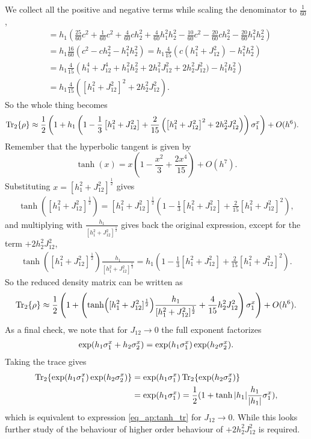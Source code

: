 We collect all the positive and negative terms while scaling the denominator to $\frac{1}{60}$,
\begin{align*}
    & = h_1\left(\frac{25}{60}c^2 + \frac{1}{60}c^2  + \frac{4}{60}c h_2^2 +  \frac{4}{60}h_1^2 h_2^2 - \frac{10}{60} c^2 - \frac{20}{60} ch_2^2 - \frac{20}{60} h_1^2 h_2^2 \right)\\
    & = h_1\frac{16}{60}\left(c^2 - c h_2^2 -  h_1^2 h_2^2 \right)= h_1\frac{4}{15}\left(c(h_1^2 + J_{12}^2) -  h_1^2 h_2^2 \right) \\
    & = h_1\frac{4}{15}\left(h_1^4 + J_{12}^4 + h_1^2 h_2^2 + 2h_1^2 J_{12}^2+ 2h_2^2 J_{12}^2) -  h_1^2 h_2^2 \right)\\
    & = h_1\frac{4}{15}\left(\left[h_1^2 + J_{12}^2\right]^2 + 2h_2^2 J_{12}^2\right).
\end{align*}
So the whole thing becomes
\begin{align*}
    \Tr_2\{\rho\}  & \approx   \frac{1}{2}\left(1 + h_1\left(1  - \frac{1}{3} \left[h_1^2 + J_{12}^2 \right]  + \frac{2}{15}\left(\left[h_1^2 + J_{12}^2\right]^2 + 2h_2^2 J_{12}^2\right)\right)\sigma^{x}_1\right) + O(h^6).
\end{align*}
Remember that the hyperbolic tangent is given by
\begin{equation*}
    \tanh(x) = x\left(1 - \frac{x^2}{3} + \frac{2x^4}{15}\right)+ O(h^7).
\end{equation*}
Substituting $x= [h_1^2 + J_{12}^2]^\frac{1}{2}$ gives
\begin{align*}
    \tanh([h_1^2 + J_{12}^2]^\frac{1}{2}) = [h_1^2 + J_{12}^2]^\frac{1}{2}\left(1 - \frac{1}{3}[h_1^2 + J_{12}^2] + \frac{2}{15}[h_1^2 + J_{12}^2]^2\right),
\end{align*}
and multiplying with $\frac{h_1}{[h_1^2 + J_{12}^2]^\frac{1}{2}}$ gives back the original expression, except for the term $+ 2h_2^2 J_{12}^2$,
\begin{align*}
    \tanh([h_1^2 + J_{12}^2]^\frac{1}{2})\frac{h_1}{[h_1^2 + J_{12}^2]^\frac{1}{2}}= h_1\left(1  - \frac{1}{3} \left[h_1^2 + J_{12}^2 \right]  + \frac{2}{15}\left[h_1^2 + J_{12}^2\right]^2\right).
\end{align*}
So the reduced density matrix can be written as 
\begin{equation}
    \Tr_2\{\rho\} \approx \frac{1}{2}\left(1 + \left(\tanh([h_1^2 + J_{12}^2]^\frac{1}{2})\frac{h_1}{[h_1^2 + J_{12}^2]^\frac{1}{2}} + \frac{4}{15}h_2^2 J_{12}^2 \right)\sigma^{x}_1 \right) + O(h^6) \label{eq_ap:tanh_tr}.
\end{equation}
As a final check, we note that for $J_{12}\to0$ the full exponent factorizes
\begin{align*}
    \exp(h_1 \sigma^{x}_1 + h_2 \sigma^{x}_2) =  \exp(h_1 \sigma^{x}_1)\exp(h_2 \sigma^{x}_2).
\end{align*}
Taking the trace gives
\begin{align*}
    \Tr_2\{\exp(h_1 \sigma^{x}_1)\exp(h_2 \sigma^{x}_2)\} &= \exp(h_1 \sigma^{x}_1)\Tr_2\{\exp(h_2 \sigma^{x}_2)\} \\
    & = \exp(h_1 \sigma^{x}_1) = \frac{1}{2}(1 + \tanh{|h_1|}\frac{h_1}{|h_1|}\sigma^{x}_1),
\end{align*}
which is equivalent to expression \ref{eq_ap:tanh_tr} for $J_{12} \to 0$. While this looks further study of the behaviour of higher order behaviour of $+ 2h_2^2 J_{12}^2$ is required.

